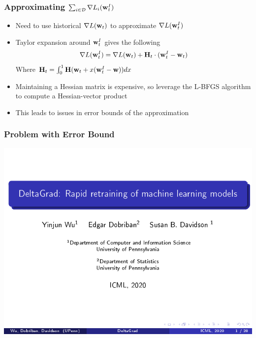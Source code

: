 \documentclass[pdf]{beamer}
\begin{document}
\begin{frame}
  \frametitle{Approximating $\sum_{i\in \mathcal{D}}\nabla L_{i}(\textbf{w}^{I}_{t})$}
  \begin{itemize}
    \item Need to use historical $\nabla L(\textbf{w}_{t})$ to approximate $\nabla L(\textbf{w}^{I}_{t})$
    \item Taylor expansion around $\textbf{w}^{I}_{t}$ gives the following
    \[
       \nabla L(\textbf{w}^{I}_{t}) = \nabla L(\textbf{w}_{t}) + \textbf{H}_{t}\cdot(\textbf{w}^{I}_{t}-\textbf{w}_{t}) 
    \]
    Where $\textbf{H}_{t} = \int_{0}^{1}\textbf{H}(\textbf{w}_{t}+x(\textbf{w}^{I}_{t}-\textbf{w}))dx$
    \item Maintaining a Hessian matrix is expensive, so leverage the L-BFGS algorithm to compute a Hessian-vector product
    \item This leads to issues in error bounds of the approximation
  \end{itemize}
    
\end{frame}

\begin{frame}
  \frametitle{Problem with Error Bound}
  \includegraphics[page=43,clip,trim=0.5cm 1cm 0cm 1cm,width=\textwidth]{images/Slides.pdf}
\end{frame}
\end{document}
